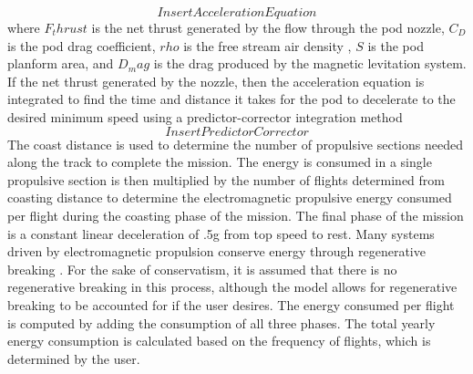 	\begin{equation}
		\label{eq:acceleration}
		Insert Acceleration Equation
	\end{equation}
	where $F_thrust$ is the net thrust generated by the flow through the pod nozzle, $C_D$ is the pod drag coefficient, $rho$ is the free stream air density , $S$ is the pod planform area, and $D_mag$ is the drag produced by the magnetic levitation system. If the net thrust generated by the nozzle, then the acceleration equation is integrated to find the time and distance it takes for the pod to decelerate to the desired minimum speed using a predictor-corrector integration method
	\begin{equation}
		\label{eq:predictor_corrector}
		Insert Predictor Corrector
	\end{equation}
	The coast distance is used to determine the number of propulsive sections needed along the track to complete the mission. The energy is consumed in a single propulsive section is then multiplied by the number of flights determined from coasting distance to determine the electromagnetic propulsive energy consumed per flight during the coasting phase of the mission. The final phase of the mission is a constant linear deceleration of .5g from top speed to rest. Many systems driven by electromagnetic propulsion conserve energy through regenerative breaking \cite{inductrack}. For the sake of conservatism, it is assumed that there is no regenerative breaking in this process, although the model allows for regenerative breaking to be accounted for if the user desires. The energy consumed per flight is computed by adding the consumption of all three phases. The total yearly energy consumption is calculated based on the frequency of flights, which is determined by the user.

